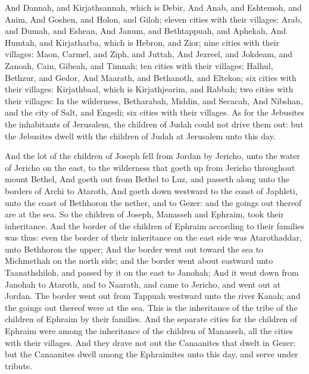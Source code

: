 \begin{biblechapter}
\verse And Dannah, and Kirjathsannah, which is Debir,
\verse And Anab, and Eshtemoh, and Anim,
\verse And Goshen, and Holon, and Giloh; eleven cities with their villages:
\verse Arab, and Dumah, and Eshean,
\verse And Janum, and Bethtappuah, and Aphekah,
\verse And Humtah, and Kirjatharba, which is Hebron, and Zior; nine cities with their villages:
\verse Maon, Carmel, and Ziph, and Juttah,
\verse And Jezreel, and Jokdeam, and Zanoah,
\verse Cain, Gibeah, and Timnah; ten cities with their villages:
\verse Halhul, Bethzur, and Gedor,
\verse And Maarath, and Bethanoth, and Eltekon; six cities with their villages:
\verse Kirjathbaal, which is Kirjathjearim, and Rabbah; two cities with their villages:
\verse In the wilderness, Betharabah, Middin, and Secacah,
\verse And Nibshan, and the city of Salt, and Engedi; six cities with their villages.
\verse As for the Jebusites the inhabitants of Jerusalem, the children of Judah could not drive them out: but the Jebusites dwell with the children of Judah at Jerusalem unto this day.
\end{biblechapter}

\begin{biblechapter} %
 And the lot of the children of Joseph fell from Jordan by Jericho, unto the water of Jericho on the east, to the wilderness that goeth up from Jericho throughout mount Bethel,
\verse And goeth out from Bethel to Luz, and passeth along unto the borders of Archi to Ataroth,
\verse And goeth down westward to the coast of Japhleti, unto the coast of Bethhoron the nether, and to Gezer: and the goings out thereof are at the sea.
\verse So the children of Joseph, Manasseh and Ephraim, took their inheritance.
\verse And the border of the children of Ephraim according to their families was thus: even the border of their inheritance on the east side was Atarothaddar, unto Bethhoron the upper;
\verse And the border went out toward the sea to Michmethah on the north side; and the border went about eastward unto Taanathshiloh, and passed by it on the east to Janohah;
\verse And it went down from Janohah to Ataroth, and to Naarath, and came to Jericho, and went out at Jordan.
\verse The border went out from Tappuah westward unto the river Kanah; and the goings out thereof were at the sea. This is the inheritance of the tribe of the children of Ephraim by their families.
\verse And the separate cities for the children of Ephraim were among the inheritance of the children of Manasseh, all the cities with their villages.
\verse And they drave not out the Canaanites that dwelt in Gezer: but the Canaanites dwell among the Ephraimites unto this day, and serve under tribute.
\end{biblechapter}

